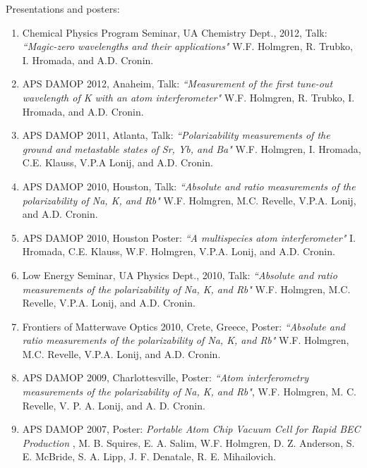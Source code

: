 \noindent Presentations and posters:

\begin{enumerate}

\item Chemical Physics Program Seminar, UA Chemistry Dept., 2012, Talk: \emph{``Magic-zero wavelengths and their applications"} W.F. Holmgren, R. Trubko, I. Hromada, and A.D. Cronin.

\item APS DAMOP 2012, Anaheim, Talk: \emph{``Measurement of the first tune-out wavelength of K with an atom interferometer"} W.F. Holmgren, R. Trubko, I. Hromada, and A.D. Cronin.

\item APS DAMOP 2011, Atlanta, Talk: \emph{``Polarizability measurements of the ground and metastable states of Sr, Yb, and Ba"} W.F. Holmgren, I. Hromada, C.E. Klauss, V.P.A Lonij, and A.D. Cronin.

\item APS DAMOP 2010, Houston, Talk: \emph{``Absolute and ratio measurements of the polarizability of Na, K, and Rb"} W.F. Holmgren, M.C. Revelle, V.P.A. Lonij, and A.D. Cronin.

\item APS DAMOP 2010, Houston Poster: \emph{``A multispecies atom interferometer"} I. Hromada, C.E. Klauss, W.F. Holmgren, V.P.A. Lonij, and A.D. Cronin.

\item Low Energy Seminar, UA Physics Dept., 2010, Talk: \emph{``Absolute and ratio measurements of the polarizability of Na, K, and Rb"} W.F. Holmgren, M.C. Revelle, V.P.A. Lonij, and A.D. Cronin.

\item Frontiers of Matterwave Optics 2010, Crete, Greece, Poster: \emph{``Absolute and ratio measurements of the polarizability of Na, K, and Rb"} W.F. Holmgren, M.C. Revelle, V.P.A. Lonij, and A.D. Cronin.

\item APS DAMOP 2009, Charlottesville, Poster: \emph{``Atom interferometry measurements of the polarizability of Na, K, and Rb"}, W.F. Holmgren, M. C. Revelle, V. P. A. Lonij, and A. D. Cronin.

\item APS DAMOP 2007, Poster: \emph{Portable Atom Chip Vacuum Cell for Rapid BEC Production} , M. B. Squires, E. A. Salim, W.F. Holmgren, D. Z. Anderson, S. E. McBride, S. A. Lipp, J. F. Denatale, R. E. Mihailovich.

\end{enumerate}


